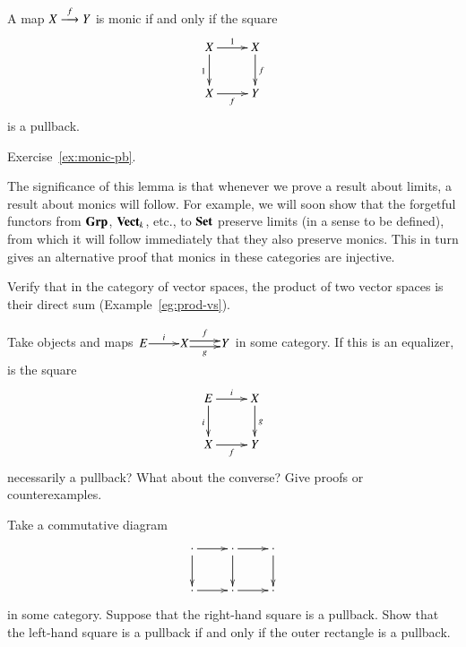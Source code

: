 \begin{lemma}   
\label{lemma:monic-pb}
A map $X \stackrel{f}{\longrightarrow} Y$ is monic if and only if the square
\[
\xymatrix{
X \ar[r]^1 \ar[d]_1     &X \ar[d]^f     \\
X \ar[r]_f              &Y
}
\]
is a pullback.
\end{lemma}

\begin{pf}
Exercise~\ref{ex:monic-pb}.
\end{pf}

The significance of this lemma is that whenever we prove a result about
limits, a result about monics will follow.  For example, we will soon show
that the forgetful functors from $\mathbf{Grp}$, $\mathbf{Vect}_k$, etc., to $\mathbf{Set}$
preserve limits (in a sense to be defined), from which it will follow
immediately that they also preserve monics.  This in turn gives an
alternative proof that monics in these categories are injective.


\exs


\begin{question}        
\label{ex:prod-vs}
Verify that in the category of vector spaces, the product of two vector
spaces is their direct sum (Example~\ref{eg:prod-vs}).
\end{question}


\begin{question}
Take objects and maps $\xymatrix@1{E \ar[r]^i &X \ar@<.5ex>[r]^{f}
\ar@<-.5ex>[r]_g &Y}$ in some category.  If this is an equalizer, is the
square 
\[
\xymatrix{
E \ar[r]^i \ar[d]_i     &
X \ar[d]^g      \\
X \ar[r]_f      &
Y
}
\]
necessarily a pullback?%
%
%
%
What about the converse?  Give proofs or counterexamples.
\end{question}


\begin{question}        
\label{ex:pb-pasting}
Take a commutative diagram 
\[
\xymatrix{
\cdot \ar[r] \ar[d]     &
\cdot \ar[r] \ar[d]     &
\cdot \ar[d]    \\
\cdot \ar[r]    &
\cdot \ar[r]    &
\cdot
}
%
\index{pullback!pasting of pullbacks}
%
\]
in some category.  Suppose that the right-hand square is a pullback.  Show
that the left-hand square is a pullback if and only if the outer rectangle is
a pullback.  
\end{question}


